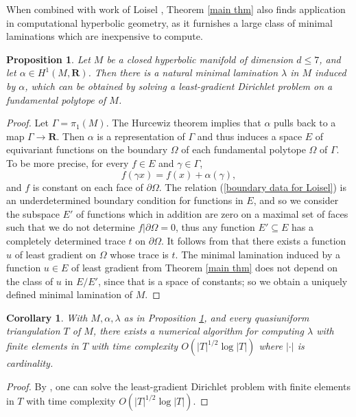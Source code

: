\documentclass[reqno,12pt,letterpaper]{amsart}
\newcommand{\RR}{\mathbf{R}}
\newtheorem{proposition}[theorem]{Proposition}
\newtheorem{corollary}[theorem]{Corollary}
\theoremstyle{definition}
\numberwithin{equation}{section}
\begin{document}
When combined with work of Loisel \cite{Loisel20}, Theorem \ref{main thm} also finds application in computational hyperbolic geometry, as it furnishes a large class of minimal laminations which are inexpensive to compute.

\begin{proposition}\label{cohomology makes laminations}
Let $M$ be a closed hyperbolic manifold of dimension $d \leq 7$, and let $\alpha \in H^1(M, \RR)$.
Then there is a natural minimal lamination $\lambda$ in $M$ induced by $\alpha$, which can be obtained by solving a least-gradient Dirichlet problem on a fundamental polytope of $M$.
\end{proposition}
\begin{proof}
Let $\Gamma = \pi_1(M)$. The Hurcewiz theorem implies that $\alpha$ pulls back to a map $\Gamma \to \RR$.
Then $\alpha$ is a representation of $\Gamma$ and thus induces a space $E$ of equivariant functions on the boundary $\Omega$ of each fundamental polytope $\Omega$ of $\Gamma$. To be more precise, for every $f \in E$ and $\gamma \in \Gamma$,
\begin{equation}\label{boundary data for Loisel}
f(\gamma x) = f(x) + \alpha(\gamma),
\end{equation}
and $f$ is constant on each face of $\partial \Omega$.
The relation (\ref{boundary data for Loisel}) is an underdetermined boundary condition for functions in $E$, and so we consider the subspace $E'$ of functions which in addition are zero on a maximal set of faces such that we do not determine $f|\partial \Omega = 0$, thus any function $E' \subseteq E$ has a completely determined trace $t$ on $\partial \Omega$.
It follows from \cite[Theorem 4.4]{daskalopoulos2020transverse} that there exists a function $u$ of least gradient on $\Omega$ whose trace is $t$.
The minimal lamination induced by a function $u \in E$ of least gradient from Theorem \ref{main thm} does not depend on the class of $u$ in $E/E'$, since that is a space of constants; so we obtain a uniquely defined minimal lamination of $M$.
\end{proof}

\begin{corollary}
With $M, \alpha, \lambda$ as in Proposition \ref{cohomology makes laminations}, and every quasiuniform triangulation $T$ of $M$, there exists a numerical algorithm for computing $\lambda$ with finite elements in $T$ with time complexity $O(|T|^{1/2} \log |T|)$ where $|\cdot|$ is cardinality.
\end{corollary}
\begin{proof}
By \cite[Theorem 1]{Loisel20}, one can solve the least-gradient Dirichlet problem with finite elements in $T$ with time complexity $O(|T|^{1/2} \log |T|)$.
\end{proof}
\end{document}
